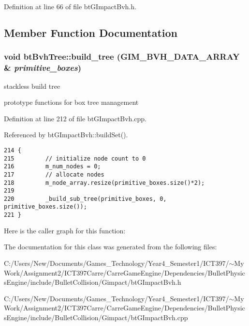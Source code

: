 Definition at line 66 of file btGImpactBvh.h.

\subsection{Member Function Documentation}
\hypertarget{classbt_bvh_tree_ed589b2985838c6268597f4f64a96c46}{
\subsubsection[build\_\-tree]{\setlength{\rightskip}{0pt plus 5cm}void btBvhTree::build\_\-tree (GIM\_\-BVH\_\-DATA\_\-ARRAY \& {\em primitive\_\-boxes})}}
\label{classbt_bvh_tree_ed589b2985838c6268597f4f64a96c46}


stackless build tree 

prototype functions for box tree management 

Definition at line 212 of file btGImpactBvh.cpp.

Referenced by btGImpactBvh::buildSet().

\begin{Code}\begin{verbatim}214 {
215         // initialize node count to 0
216         m_num_nodes = 0;
217         // allocate nodes
218         m_node_array.resize(primitive_boxes.size()*2);
219 
220         _build_sub_tree(primitive_boxes, 0, primitive_boxes.size());
221 }
\end{verbatim}
\end{Code}




Here is the caller graph for this function:

The documentation for this class was generated from the following files:\begin{CompactItemize}
\item 
C:/Users/New/Documents/Games\_\-Technology/Year4\_\-Semester1/ICT397/$\sim$My Work/Assignment2/ICT397Carre/CarreGameEngine/Dependencies/BulletPhysicsEngine/include/BulletCollision/Gimpact/btGImpactBvh.h\item 
C:/Users/New/Documents/Games\_\-Technology/Year4\_\-Semester1/ICT397/$\sim$My Work/Assignment2/ICT397Carre/CarreGameEngine/Dependencies/BulletPhysicsEngine/include/BulletCollision/Gimpact/btGImpactBvh.cpp\end{CompactItemize}
